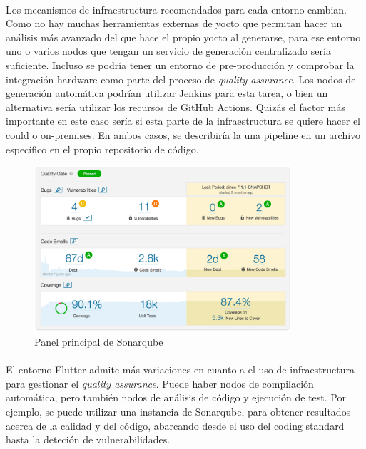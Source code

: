 \paragraph{}Los mecanismos de infraestructura recomendados para cada entorno cambian.
Como no hay muchas herramientas externas de yocto que permitan hacer un análisis más
avanzado del que hace el propio yocto al generarse, para ese entorno uno o varios nodos
que tengan un servicio de generación centralizado sería suficiente. Incluso se podría
tener un entorno de pre-producción y comprobar la integración hardware como parte del
proceso de \emph{quality assurance}. Los nodos de generación automática podrían utilizar
Jenkins para esta tarea, o bien un alternativa sería utilizar los recursos de GitHub
Actions. Quizás el factor más importante en este caso sería si esta parte de la
infraestructura se quiere hacer el could o \gls{on-premises}. En ambos casos, se
describiría la una \gls{pipeline} en un archivo específico en el propio repositorio de
código.

\begin{figure}[H]
    \centering
    \includegraphics[width=0.85\textwidth]{imgs/sonarqube}
    \caption{Panel principal de Sonarqube}
    \label{imgs:sonarqube}
\end{figure}

\paragraph{}El entorno Flutter admite más variaciones en cuanto a el uso de infraestructura
para gestionar el \emph{quality assurance}. Puede haber nodos de compilación automática,
pero también nodos de análisis de código y ejecución de test. Por ejemplo, se puede
utilizar una instancia de Sonarqube, para obtener resultados acerca de la calidad y del
código, abarcando desde el uso del \gls{coding standard} hasta la deteción de vulnerabilidades.

